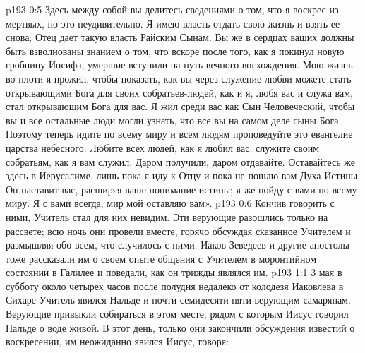 \vs p193 0:5 Здесь между собой вы делитесь сведениями о том, что я воскрес из мертвых, но это неудивительно. Я имею власть отдать свою жизнь и взять ее снова; Отец дает такую власть Райским Сынам. Вы же в сердцах ваших должны быть взволнованы знанием о том, что вскоре после того, как я покинул новую гробницу Иосифа, умершие вступили на путь вечного восхождения. Мою жизнь во плоти я прожил, чтобы показать, как вы через служение любви можете стать открывающими Бога для своих собратьев\hyp{}людей, как и я, любя вас и служа вам, стал открывающим Бога для вас. Я жил среди вас как Сын Человеческий, чтобы вы и все остальные люди могли узнать, что все вы на самом деле сыны Бога. Поэтому теперь идите по всему миру и всем людям проповедуйте это евангелие царства небесного. Любите всех людей, как я любил вас; служите своим собратьям, как я вам служил. Даром получили, даром отдавайте. Оставайтесь же здесь в Иерусалиме, лишь пока я иду к Отцу и пока не пошлю вам Духа Истины. Он наставит вас, расширяя ваше понимание истины; я же пойду с вами по всему миру. Я с вами всегда; мир мой оставляю вам».
\vs p193 0:6 \pc Кончив говорить с ними, Учитель стал для них невидим. Эти верующие разошлись только на рассвете; всю ночь они провели вместе, горячо обсуждая сказанное Учителем и размышляя обо всем, что случилось с ними. Иаков Зеведеев и другие апостолы тоже рассказали им о своем опыте общения с Учителем в моронтийном состоянии в Галилее и поведали, как он трижды являлся им.
\vs p193 1:1 3 мая в субботу около четырех часов после полудня недалеко от колодезя Иаковлева в Сихаре Учитель явился Нальде и почти семидесяти пяти верующим самарянам. Верующие привыкли собираться в этом месте, рядом с которым Иисус говорил Нальде о воде живой. В этот день, только они закончили обсуждения известий о воскресении, им неожиданно явился Иисус, говоря:
